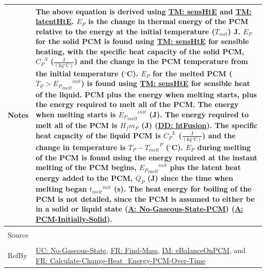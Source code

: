 \documentclass[12pt]{article}
\begin{document}
\begin{minipage}{\textwidth}
\begin{tabular}{>{\raggedright}p{}>{\raggedright\arraybackslash}p{}}
Notes & The above equation is derived using \hyperref[TM:sensHtE]{TM: sensHtE} and \hyperref[TM:latentHtE]{TM: latentHtE}. ${E_{P}}$ is the change in thermal energy of the PCM relative to the energy at the initial temperature (${T_{init}}$) J. ${E_{P}}$ for the solid PCM is found using \hyperref[TM:sensHtE]{TM: sensHtE} for sensible heating, with the specific heat capacity of the solid PCM, ${{C_{P}}^{S}}$ ($\frac{\text{J}}{(\text{kg}{}^{\circ}\text{C})}$) and the change in the PCM temperature from the initial temperature (${}^{\circ}$C). ${E_{P}}$ for the melted PCM (${T_{P}}>{{{E_{P}}_{melt}}^{init}}$) is found using \hyperref[TM:sensHtE]{TM: sensHtE} for sensible heat of the liquid. PCM plus the energy when melting starts, plus the energy required to melt all of the PCM. The energy when melting starts is ${{{E_{P}}_{melt}}^{init}}$ (J). The energy required to melt all of the PCM is ${H_{f}} {m_{P}}$ (J) (\hyperref[DD:htFusion]{DD: htFusion}). The specific heat capacity of the liquid PCM is ${{C_{P}}^{L}}$ ($\frac{\text{J}}{(\text{kg}{}^{\circ}\text{C})}$) and the change in temperature is ${T_{P}}-{{T_{melt}}^{P}}$ (${}^{\circ}$C). ${E_{P}}$ during melting of the PCM is found using the energy required at the instant melting of the PCM begins, ${{{E_{P}}_{melt}}^{init}}$ plus the latent heat energy added to the PCM, ${Q_{P}}$ (J) since the time when melting began ${{t_{melt}}^{init}}$ (s). The heat energy for boiling of the PCM is not detailed, since the PCM is assumed to either be in a solid or liquid state (\hyperref[assumpNGSP]{A: No-Gaseous-State-PCM}) (\hyperref[assumpPIS]{A: PCM-Initially-Solid}).
\\ \midrule \\
Source & \cite{koothoor2013}
\\ \midrule \\
RefBy & \hyperref[unlikeChgNGS]{UC: No-Gaseous-State}, \hyperref[findMass]{FR: Find-Mass}, \hyperref[IM:eBalanceOnPCM]{IM: eBalanceOnPCM}, and \hyperref[calcChgHeatEnergyPCMOverTime]{FR: Calculate-Change-Heat\_Energy-PCM-Over-Time}
\\ \bottomrule
\end{tabular}
\end{minipage}
\end{document}
